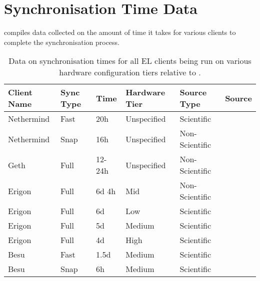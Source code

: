 \chapter{Synchronisation Time Data}
\label{Appendix B}
 compiles data collected on the amount of time it takes for various clients to complete the synchronisation process. 

\begin{table}[htb!]
\centering
\begin{tabular}{|l|l|l|l|l|l|}
\hline
\textbf{Client Name} & \textbf{Sync Type} & \textbf{Time} & \textbf{Hardware Tier} & \textbf{Source Type} & \textbf{Source} \\ \hline
Nethermind & Fast & 20h    & Unspecified & Scientific   & \cite{2022SyncDocs} \\ \hline
Nethermind & Snap & 16h    & Unspecified & Non-Scientific & \cite{3Ethstakerc} \\ \hline
Geth       & Full & 12-24h & Unspecified & Non-Scientific & \cite{3Ethstakerb} \\ \hline
Erigon     & Full & 6d 4h  & Mid         & Non-Scientific & \cite{3Ethstaker}  \\ \hline
Erigon     & Full & 6d     & Low         & Scientific   & \cite{2022Ledgerwatch/erigon:Frontier}  \\ \hline
Erigon     & Full & 5d     & Medium      & Scientific   & \cite{2022Ledgerwatch/erigon:Frontier}  \\ \hline
Erigon     & Full & 4d     & High        & Scientific   &\cite{2022Ledgerwatch/erigon:Frontier} \\ \hline
Besu       & Fast & 1.5d   & Medium      & Scientific   & \cite{SyncBesu} \\ \hline
Besu       & Snap & 6h     & Medium      & Scientific   & \cite{SyncBesu} \\ \hline
\end{tabular}
\caption{Data on synchronisation times for all EL clients being run on various hardware configuration tiers relative to  .}
\label{Table:ELRunTime}
\end{table}
